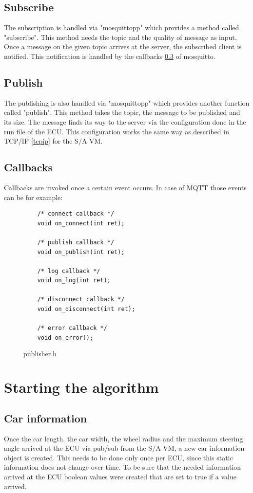 \documentclass[paper=a4, fontsize=11pt]{scrreprt}
\begin{document}
  \subsection{Subscribe}
The subscription is handled via "mosquittopp" which provides a method called "subscribe". This method needs the topic and the quality of message as input. Once a message on the given topic arrives at the server, the subscribed client is notified. This notification is handled by the callbacks \ref{ar_callbacks} of mosquitto.
  \subsection{Publish}
The publishing is also handled via "mosquittopp" which provides another function called "publish". This method takes the topic, the message to be published and its size. The message finds its way to the server via the configuration done in the run file of the ECU. This configuration works the same way as described in TCP/IP \ref{tcpip} for the S/A VM.
\newpage
  \subsection{Callbacks} \label{ar_callbacks}
Callbacks are invoked once a certain event occurs. In case of MQTT those events can be for example:\newline
\begin{figure}[!h]
  \centering
    \begin{verbatim}
	/* connect callback */
	void on_connect(int ret);

	/* publish callback */
	void on_publish(int ret);

	/* log callback */
	void on_log(int ret);

	/* disconnect callback */
	void on_disconnect(int ret);
	
	/* error callback */
	void on_error();
    \end{verbatim}
    \caption{publisher.h}
  \end{figure}
  \section{Starting the algorithm}
  \subsection{Car information}
Once the car length, the car width, the wheel radius and the maximum steering angle arrived at the ECU via pub/sub from the S/A VM, a new car information object is created. This needs to be done only once per ECU, since this static information does not change over time.
To be sure that the needed information arrived at the ECU boolean values were created that are set to true if a value arrived.
\end{document}

